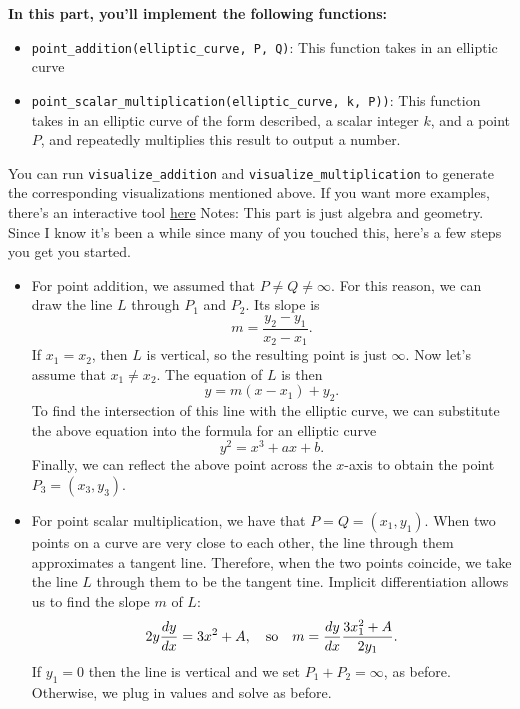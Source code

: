 \documentclass{article}
\begin{document}
\begin{tcolorbox}[enhanced,interior style={top color=Plum!20,bottom color=Plum!40}]
    \textbf{In this part, you'll implement the following functions:}
    \begin{itemize}
        \item \lstinline{point_addition(elliptic_curve, P, Q)}: This function takes in an elliptic curve 
        \item \lstinline{point_scalar_multiplication(elliptic_curve, k, P))}: This function takes in an elliptic curve of the form described, a scalar integer $k$, and a point $P$, and repeatedly multiplies this result to output a number.
    \end{itemize}
    You can run \lstinline{visualize_addition} and \lstinline{visualize_multiplication} to generate the corresponding visualizations mentioned above. If you want more examples, there's an interactive tool \href{https://andrea.corbellini.name/ecc/interactive/reals-add.html}{here}
    Notes: This part is just algebra and geometry. Since I know it's been a while since many of you touched this, here's a few steps you get you started.
    \begin{itemize}
        \item For point addition, we assumed that $P \ne Q \ne \infty$. For this reason, we can draw the line $L$ through $P_{1}$ and $P_{2}$. Its slope is $$m = \frac{y_{2} - y_{1}}{x_{2} - x_{1}}.$$ If $x_{1} = x_{2}$, then $L$ is vertical, so the resulting point is just $\infty$. Now let's assume that $x_{1} \ne x_{2}$. The equation of $L$ is then $$y = m(x - x_{1}) + y_{2}.$$ To find the intersection of this line with the elliptic curve, we can substitute the above equation into the formula for an elliptic curve $$y^{2} = x^{3} + ax + b.$$ Finally, we can reflect the above point across the $x$-axis to obtain the point $P_{3} = (x_{3}, y_{3})$.
        \item For point scalar multiplication, we have that $P = Q = (x_{1}, y_{1})$. When two points on a curve are very close to each other, the line through them approximates a tangent line. Therefore, when the two points coincide, we take the line $L$ through them to be the tangent tine. Implicit differentiation allows us to find the slope $m$ of $L$: $$2y \frac{dy}{dx} = 3x^{2} + A,\text{\quad so\quad} m = \frac{dy}{dx}\frac{3x_{1}^{2} + A}{2y_{1}}.$$ If $y_{1} = 0$ then the line is vertical and we set $P_{1} + P_{2} = \infty$, as before. Otherwise, we plug in values and solve as before.
    \end{itemize}
    
\end{tcolorbox}
\end{document}
